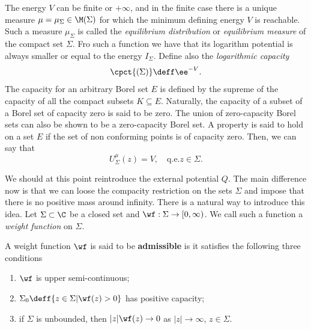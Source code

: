 The energy $V$ can be finite or $+\infty$, and in the finite case there is a unique measure $\mu = \mu_\Sigma \in \M(\Sigma)$ for which the minimum defining energy $V$ is reachable. Such a measure $\mu_\Sigma$ is called the \textit{equilibrium distribution} or \textit{equilibrium measure} of the compact set $\Sigma$. Fro such a function we have that its logarithm potential is always smaller or equal to the energy $I_\Sigma$. Define also the \textit{logarithmic capacity}
\begin{equation}
	\cpct{(\Sigma)} \deff \ee^{-V}.
\end{equation} 
The capacity for an arbitrary Borel set $E$ is defined by the supreme of the capacity of all the compact subsets $K \subseteq E$. Naturally, the capacity of a subset of a Borel set of capacity zero is said to be zero. The union of zero-capacity Borel sets can also be shown to be a zero-capacity Borel set. A property is said to hold  on a set $E$ if the set of non  conforming points is of capacity zero. Then, we can say that
\begin{equation}
	U^\mu_\Sigma(z) = V, \quad \text{q.e.} z \in \Sigma. 
\end{equation} 

We should at this point reintroduce the external potential $Q$. The main difference now is that we can loose the compacity restriction on the sets $\Sigma$ and impose that there is no positive mass around infinity. There is a natural way to introduce this idea. Let $\Sigma \subset \C$ be a closed set and $\wf : \Sigma \rightarrow [0, \infty)$. We call such a function a \textit{weight function} on $\Sigma$.

\begin{definicao}
	A weight function $\wf$ is said to be \textbf{admissible} is it satisfies the following three conditions
	\begin{enumerate}
		\item $\wf$ is upper semi-continuous;
		\item $\Sigma_0 \deff \{ z \in \Sigma | \wf(z) > 0 \}$ has positive capacity;
		\item if $\Sigma$ is unbounded, then $|z| \wf(z) \rightarrow 0$ as $|z| \rightarrow \infty$, $z \in \Sigma$.
	\end{enumerate} 
\end{definicao}

